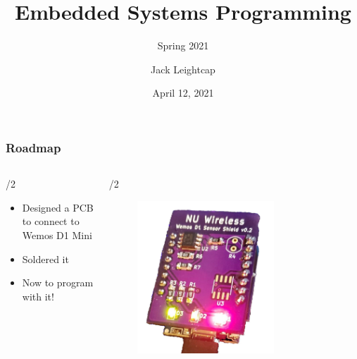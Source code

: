 \documentclass{beamer} \usetheme{Madrid}
\title{Embedded Systems Programming}
\subtitle{Spring 2021}
\author[]{Jack Leightcap\inst{1}\inst{2}}
\institute[IEEE, Wireless Club]{
	\inst{1}IEEE -- \url{nuieeeofficers@gmail.com}
	\and
	\inst{2}Wireless Club -- \url{nuwirelessclub@gmail.com}
}
\date[Spring 2021]{April 12, 2021}
\begin{document}
\frame{\titlepage}

\begin{frame}
	\frametitle{Roadmap}
	\begin{columns}[t]
		\begin{column}{{\textwidth}/2}
			\begin{itemize}
				\item Designed a PCB to connect to Wemos D1 Mini
				\item Soldered it
				\item Now to program with it!
			\end{itemize}
		\end{column}
		\begin{column}{{\textwidth}/2}
			\begin{figure}[H]
				\centering
				\includegraphics[width=0.7\textwidth]{board.jpeg}
			\end{figure}
		\end{column}
	\end{columns}
\end{frame}
\end{document}
